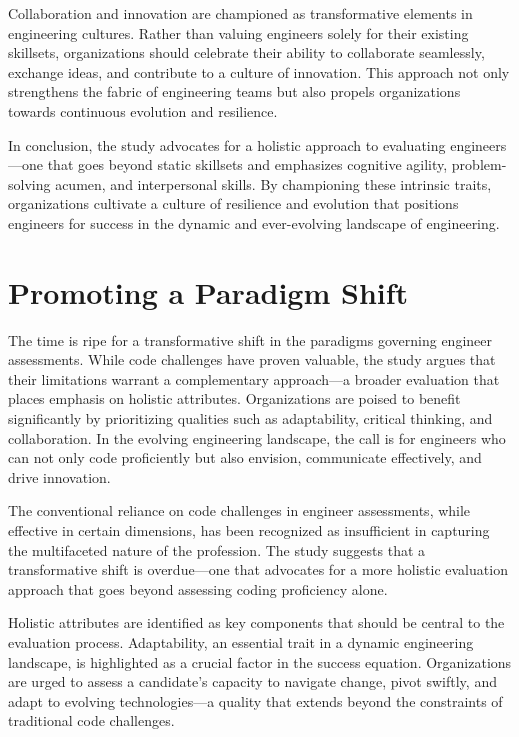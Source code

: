 \documentclass[
    a4paper, %
    10pt, %
    unnumberedsections, %
    twoside, %
]{LTJournalArticle}
\begin{document}
Collaboration and innovation are championed as transformative elements in engineering cultures. Rather than valuing engineers solely for their existing skillsets, organizations should celebrate their ability to collaborate seamlessly, exchange ideas, and contribute to a culture of innovation. This approach not only strengthens the fabric of engineering teams but also propels organizations towards continuous evolution and resilience.

In conclusion, the study advocates for a holistic approach to evaluating engineers—one that goes beyond static skillsets and emphasizes cognitive agility, problem-solving acumen, and interpersonal skills. By championing these intrinsic traits, organizations cultivate a culture of resilience and evolution that positions engineers for success in the dynamic and ever-evolving landscape of engineering.

\section{Promoting a Paradigm Shift}

The time is ripe for a transformative shift in the paradigms governing engineer assessments. While code challenges have proven valuable, the study argues that their limitations warrant a complementary approach—a broader evaluation that places emphasis on holistic attributes. Organizations are poised to benefit significantly by prioritizing qualities such as adaptability, critical thinking, and collaboration. In the evolving engineering landscape, the call is for engineers who can not only code proficiently but also envision, communicate effectively, and drive innovation.

The conventional reliance on code challenges in engineer assessments, while effective in certain dimensions, has been recognized as insufficient in capturing the multifaceted nature of the profession. The study suggests that a transformative shift is overdue—one that advocates for a more holistic evaluation approach that goes beyond assessing coding proficiency alone.

Holistic attributes are identified as key components that should be central to the evaluation process. Adaptability, an essential trait in a dynamic engineering landscape, is highlighted as a crucial factor in the success equation. Organizations are urged to assess a candidate's capacity to navigate change, pivot swiftly, and adapt to evolving technologies—a quality that extends beyond the constraints of traditional code challenges.
\end{document}
